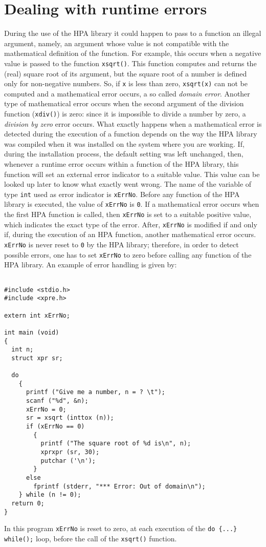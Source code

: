 \documentclass{article}
\begin{document}
\section{Dealing with runtime errors}
During the use of the HPA library it could happen to pass
to a function an illegal argument, namely, an argument whose
value is not compatible with the mathematical definition of the function.
For example, this occurs when a negative value is passed to
the function \texttt{xsqrt()}. This function computes and returns 
the (real) square root of its argument, but the square root of a number
is defined only for non-negative numbers.
So, if \texttt{x} is less than zero, \texttt{xsqrt(x)} can not
be computed and a mathematical error occurs, a so called \textit{domain error}.
Another type of mathematical error occurs when the second argument
of the division function (\texttt{xdiv()}) is zero: since it is impossible
to divide a number by zero, a \textit{division by zero} error occurs.
What exactly happens when a mathematical error is detected during the
execution of a function depends on the way the HPA library was compiled
when it was installed on the system where you are working.
If, during the installation process, the default setting was left
unchanged, then, whenever a runtime error occurs within a function of the HPA
library, this function will set an external error indicator to
a suitable value. This value can be looked up later
to know what exactly went wrong.
The name of the variable of type \texttt{int} used as error indicator
is \texttt{xErrNo}. Before any function of the HPA library is
executed, the value of \texttt{xErrNo} is \texttt{0}.
If a mathematical error occurs when the first HPA function is called, 
then \texttt{xErrNo} is set to a suitable positive value,
which indicates the exact type of the error.
After, \texttt{xErrNo} is modified if and only if, during the execution of
an HPA function, another mathematical error occurs. \texttt{xErrNo} is never
reset to \texttt{0} by the HPA library; therefore, in order to detect 
possible errors, one has to
set \texttt{xErrNo} to zero before calling any function of the HPA library. 
An example of error handling is given by:

\begin{verbatim}

#include <stdio.h>
#include <xpre.h>

extern int xErrNo;

int main (void)
{
  int n;
  struct xpr sr;

  do
    {
      printf ("Give me a number, n = ? \t");
      scanf ("%d", &n);
      xErrNo = 0;
      sr = xsqrt (inttox (n));
      if (xErrNo == 0)
        {
          printf ("The square root of %d is\n", n);
          xprxpr (sr, 30);
          putchar ('\n');
        }
      else
        fprintf (stderr, "*** Error: Out of domain\n");
    } while (n != 0);
  return 0;
}

\end{verbatim}
In this program \texttt{xErrNo} is reset to zero, at each execution of the
\texttt{do \{...\} while();} loop, before the call of the \texttt{xsqrt()} function.
\end{document}
